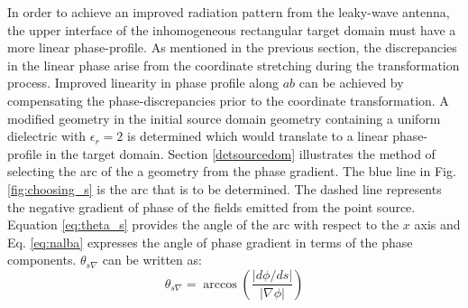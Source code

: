 In order to achieve an improved radiation pattern from the leaky-wave antenna, the upper interface of the inhomogeneous rectangular target domain must have a more linear phase-profile. As mentioned in the previous section, the discrepancies in the linear phase arise from the coordinate stretching during the transformation process. Improved linearity in phase profile along $ab$ can be achieved by compensating the phase-discrepancies prior to the coordinate transformation. A modified geometry in the initial source domain geometry containing a uniform dielectric with $\epsilon_r = 2$ is determined which would translate to a linear phase-profile in the target domain. Section \ref{detsourcedom} illustrates the method of selecting the arc of the a geometry from the phase gradient. The blue line in Fig. \ref{fig:choosing_s} is the arc that is to be determined. The dashed line represents the negative gradient of phase of the fields emitted from the point source. Equation \ref{eq:theta_s} provides the angle of the arc with respect to the $x$ axis and Eq. \ref{eq:nalba} expresses the angle of phase gradient in terms of the phase components. $\theta_{s\nabla}$ can be written as:
%
\begin{equation}
\theta_{s\nabla} = \arccos \left( \dfrac{|d\phi/ds|}{|\nabla \phi|} \right)
\end{equation}


